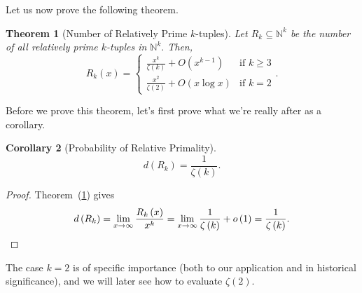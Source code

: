 \documentclass[11pt]{article}
\newcommand{\refn}[1]{\textnormal{(\ref{#1})}}
\newtheorem{theorem}{Theorem}
\newtheorem{corollary}[theorem]{Corollary}
\begin{document}
Let us now prove the following theorem.

\begin{theorem}[Number of Relatively Prime $k$-tuples]
\label{thm:relprime}
Let $R_{k}\subseteq \mathbb{N}^{k}$ be the number of all relatively prime $k$-tuples in $\mathbb{N}^{k}.$ Then, $$R_{k}\left(x\right) = \begin{cases} \frac{x^{k}}{\zeta\left(k\right)} + O\left(x^{k-1}\right) & \mbox{if } k\geq 3 \\
\frac{x^{2}}{\zeta\left(2\right)} + O\left(x\log x\right) &\mbox{if } k = 2\end{cases}.$$
\end{theorem}

Before we prove this theorem, let's first prove what we're really after as a corollary.

\begin{corollary}[Probability of Relative Primality]
$$d\left(R_{k}\right) = \frac{1}{\zeta\left(k\right)}.$$
\end{corollary}

\begin{proof} Theorem~\refn{thm:relprime} gives
$$d\left(R_{k}\right) =  \lim_{x\to\infty} \frac{R_{k}\left(x\right)}{x^{k}} = \lim_{x\to\infty} \frac{1}{\zeta\left(k\right)} + o\left(1\right) = \frac{1}{\zeta\left(k\right)}.\qedhere$$
\end{proof}

The case $k=2$ is of specific importance (both to our application and in historical significance), and we will later see how to evaluate $\zeta\left(2\right).$
\end{document}
